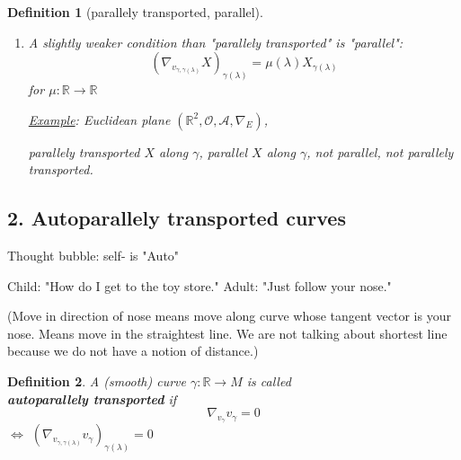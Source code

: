 \documentclass[10pt]{amsart}
\newtheorem{definition}{Definition}
\begin{document}
\begin{multicols*}{2}
\begin{definition}[parallely transported, parallel]
\begin{enumerate}
\[
\left( \nabla_{v_{\gamma, \gamma(\lambda) } } X \right)_{\gamma(\lambda)} = 0 
\]	

	\item[(2)] A slightly weaker condition than "parallely transported" is "parallel":
			\[
( \nabla_{v_{\gamma, \gamma(\lambda)} } X)_{\gamma(\lambda)} = \mu(\lambda) X_{\gamma(\lambda)}
\]
for $\mu : \mathbb{R} \to \mathbb{R}$

\underline{Example}: \emph{Euclidean plane} $(\mathbb{R}^2, \mathcal{O}, \mathcal{A}, \nabla_E)$,

parallely transported $X$ along $\gamma$, parallel $X$ along $\gamma$, not parallel, not parallely transported.
\end{enumerate}
\end{definition}

			
			
								
	
	\subsection*{2. Autoparallely transported curves}
	Thought bubble: self- is "Auto"
	
	Child: "How do I get to the toy store." Adult: "Just follow your nose." 
	
	(Move in direction of nose means move along curve whose tangent vector is your nose. Means move in the straightest line. We are not talking about shortest line because we do not have a notion of distance.)
	
	\begin{definition}
		A (smooth) curve $\gamma: \mathbb{R} \to M$ is called \\
		\textbf{autoparallely transported} if 
		\begin{equation}
		\nabla_{v_{\gamma}}v_{\gamma} = 0
		\end{equation}
	$\Longleftrightarrow $ $\left( \nabla_{v_{\gamma, \gamma(\lambda)}} v_{\gamma} \right)_{\gamma(\lambda)} = 0$ 
	\end{definition}
	

\end{multicols*}
\end{document}
